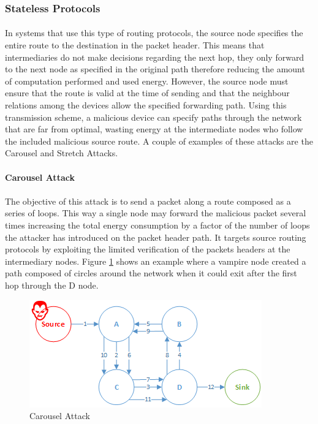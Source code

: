 \subsubsection{Stateless Protocols}
\label{sec:source_routing}
\paragraph{}
In systems that use this type of routing protocols, the source node specifies the entire route to the destination in the packet header. This means that intermediaries do not make decisions regarding the next hop, they only forward to the next node as specified in the original path therefore reducing the amount of computation performed and used energy. However, the source node must ensure that the route is valid at the time of sending and that the neighbour relations among the devices allow the specified forwarding path. Using this transmission scheme, a malicious device can specify paths through the network that are far from optimal, wasting energy at the intermediate nodes who follow the included malicious source route. A couple of examples of these attacks are the Carousel and Stretch Attacks.

\paragraph{\textbf{Carousel Attack}}
\paragraph{}
The objective of this attack is to send a packet along a route composed as a series of loops. This way a single node may forward the malicious packet several times increasing the total energy consumption by a factor of the number of loops the attacker has introduced on the packet header path. It targets source routing protocols by exploiting the limited verification of the packets headers at the intermediary nodes. Figure \ref{fig:carousel_attack} shows an example where a vampire node created a path composed of circles around the network when it could exit after the first hop through the D node.
 
\begin{figure}[h]
  \centering
  \includegraphics[width=0.8\linewidth]{figures/Carousel_Attack.png}
  \caption{Carousel Attack}
  \label{fig:carousel_attack}
\end{figure}


